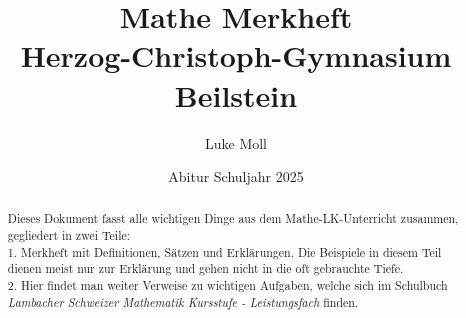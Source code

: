 \documentclass[12pt,a4paper]{report}
\title{Mathe Merkheft
{\\\Large Herzog-Christoph-Gymnasium Beilstein}}
\author{Luke Moll}
\date{Abitur Schuljahr 2025}
\begin{document}
\newtheorem{satz}{Satz}
\newtheorem{definition}{Definition}
\maketitle
\begin{abstract}
    Dieses Dokument fasst alle wichtigen Dinge aus dem Mathe-LK-Unterricht zusammen, gegliedert in zwei Teile: \\ 1. Merkheft mit Definitionen, Sätzen und Erklärungen. Die Beispiele in diesem Teil dienen meist nur zur Erklärung und gehen nicht in die oft gebrauchte Tiefe. \\ 2. Hier findet man weiter Verweise zu wichtigen Aufgaben, welche sich im Schulbuch \textit{Lambacher Schweizer Mathematik Kursstufe - Leistungsfach} finden.\\
\end{abstract}
\tableofcontents
\vspace{2cm} %







\end{document}
